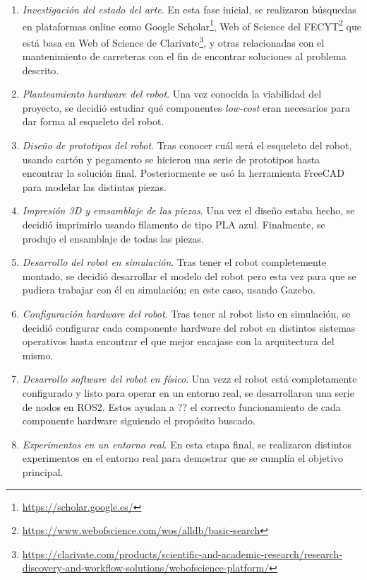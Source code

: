 \begin{enumerate}
	\item{\textit{Investigación del estado del arte}}. En esta fase inicial, se realizaron búsquedas en plataformas online como Google Scholar\footnote{\url{https://scholar.google.es/}}, Web of Science del FECYT\footnote{\url{https://www.webofscience.com/wos/alldb/basic-search}} que está basa en Web of Science de Clarivate\footnote{\url{https://clarivate.com/products/scientific-and-academic-research/research-discovery-and-workflow-solutions/webofscience-platform/}}, y otras relacionadas con el mantenimiento de carreteras con el fin de encontrar soluciones al problema descrito. 
	
	\item{\textit{Planteamiento hardware del robot}}. Una vez conocida la viabilidad del proyecto, se decidió estudiar qué componentes \textit{low-cost} eran necesarios para dar forma al esqueleto del robot. 
	
	\item{\textit{Diseño de prototipos del robot}}. Tras conocer cuál será el esqueleto del robot, usando cartón y pegamento se hicieron una serie de prototipos hasta encontrar la solución final. Posteriormente se usó la herramienta FreeCAD para modelar las distintas piezas.
	
	\item{\textit{Impresión 3D y emsamblaje de las piezas}}. Una vez el diseño estaba hecho, se decidió imprimirlo usando filamento de tipo PLA azul. Finalmente, se produjo el ensamblaje de todas las piezas.
	
	\item{\textit{Desarrollo del robot en simulación}}. Tras tener el robot completemente montado, se decidió desarrollar el modelo del robot pero esta vez para que se pudiera trabajar con él en simulación; en este caso, usando Gazebo.
	
	\item{\textit{Configuración hardware del robot}}. Tras tener al robot listo en simulación, se decidió configurar cada componente hardware del robot en distintos sistemas operativos hasta encontrar el que mejor encajase con la arquitectura del mismo. 
	
	\item{\textit{Desarrollo software del robot en físico}}. Una vezz el robot está completamente configurado y listo para operar en un entorno real, se desarrollaron una serie de nodos en ROS2. Estos ayudan a ?? el correcto funcionamiento de cada componente hardware siguiendo el propósito buscado. 
	
	\item{\textit{Experimentos en un entorno real}}. En esta etapa final, se realizaron distintos experimentos en el entorno real para demostrar que se cumplía el objetivo principal.

\end{enumerate}

